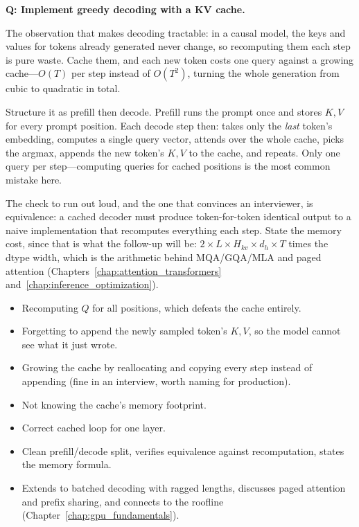 \begin{interviewq}
\textbf{Q: Implement greedy decoding with a KV cache.}

 \quad {} \quad \badgefreq{\freqhigh}

\stronganswer

The observation that makes decoding tractable: in a causal model, the keys and values for tokens already generated never change, so recomputing them each step is pure waste. Cache them, and each new token costs one query against a growing cache---$O(T)$ per step instead of $O(T^2)$, turning the whole generation from cubic to quadratic in total.

Structure it as prefill then decode. Prefill runs the prompt once and stores $K, V$ for every prompt position. Each decode step then: takes only the \emph{last} token's embedding, computes a single query vector, attends over the whole cache, picks the argmax, appends the new token's $K, V$ to the cache, and repeats. Only one query per step---computing queries for cached positions is the most common mistake here.

The check to run out loud, and the one that convinces an interviewer, is equivalence: a cached decoder must produce token-for-token identical output to a naive implementation that recomputes everything each step. State the memory cost, since that is what the follow-up will be: $2 \times L \times H_{kv} \times d_h \times T$ times the dtype width, which is the arithmetic behind MQA/GQA/MLA and paged attention (Chapters~\ref{chap:attention_transformers} and~\ref{chap:inference_optimization}).

\redflags
\begin{itemize}
    \item Recomputing $Q$ for all positions, which defeats the cache entirely.
    \item Forgetting to append the newly sampled token's $K, V$, so the model cannot see what it just wrote.
    \item Growing the cache by reallocating and copying every step instead of appending (fine in an interview, worth naming for production).
    \item Not knowing the cache's memory footprint.
\end{itemize}


\goodgreat
\begin{itemize}
    \item {} Correct cached loop for one layer.
    \item {} Clean prefill/decode split, verifies equivalence against recomputation, states the memory formula.
    \item {} Extends to batched decoding with ragged lengths, discusses paged attention and prefix sharing, and connects to the roofline (Chapter~\ref{chap:gpu_fundamentals}).
\end{itemize}


\end{interviewq}
